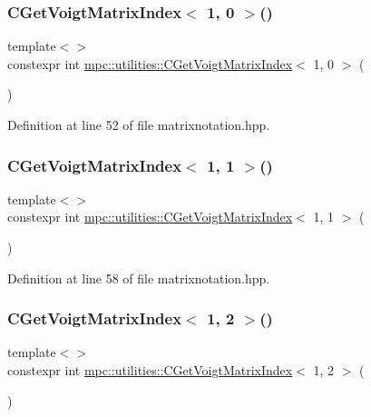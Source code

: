 \subsubsection{\texorpdfstring{C\+Get\+Voigt\+Matrix\+Index$<$ 1, 0 $>$()}{CGetVoigtMatrixIndex< 1, 0 >()}}
{\footnotesize\ttfamily template$<$$>$ \\
constexpr int \mbox{\hyperlink{namespacempc_1_1utilities_ad2c3679a8e007d8b5a333490886ef19d}{mpc\+::utilities\+::\+C\+Get\+Voigt\+Matrix\+Index}}$<$ 1, 0 $>$ (\begin{DoxyParamCaption}{ }\end{DoxyParamCaption})\hspace{0.3cm}{\ttfamily [inline]}}



Definition at line 52 of file matrixnotation.\+hpp.

\mbox{\label{namespacempc_1_1utilities_ac1968a4d83d920187abe3b8ea87d1262}} 
\subsubsection{\texorpdfstring{C\+Get\+Voigt\+Matrix\+Index$<$ 1, 1 $>$()}{CGetVoigtMatrixIndex< 1, 1 >()}}
{\footnotesize\ttfamily template$<$$>$ \\
constexpr int \mbox{\hyperlink{namespacempc_1_1utilities_ad2c3679a8e007d8b5a333490886ef19d}{mpc\+::utilities\+::\+C\+Get\+Voigt\+Matrix\+Index}}$<$ 1, 1 $>$ (\begin{DoxyParamCaption}{ }\end{DoxyParamCaption})\hspace{0.3cm}{\ttfamily [inline]}}



Definition at line 58 of file matrixnotation.\+hpp.

\mbox{\label{namespacempc_1_1utilities_ac2da9934134d3a5867b925e1084bf1e4}} 
\subsubsection{\texorpdfstring{C\+Get\+Voigt\+Matrix\+Index$<$ 1, 2 $>$()}{CGetVoigtMatrixIndex< 1, 2 >()}}
{\footnotesize\ttfamily template$<$$>$ \\
constexpr int \mbox{\hyperlink{namespacempc_1_1utilities_ad2c3679a8e007d8b5a333490886ef19d}{mpc\+::utilities\+::\+C\+Get\+Voigt\+Matrix\+Index}}$<$ 1, 2 $>$ (\begin{DoxyParamCaption}{ }\end{DoxyParamCaption})\hspace{0.3cm}{\ttfamily [inline]}}



